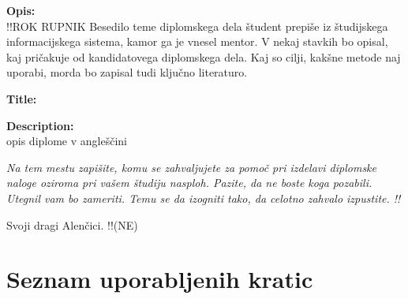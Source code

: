 \documentclass[a4paper,12pt,openright]{book}
\newcommand{\clearemptydoublepage}{\newpage{\pagestyle{empty}\cleardoublepage}}
\begin{document}
\bigskip
\noindent\textbf{Opis:}\\ !!ROK RUPNIK
Besedilo teme diplomskega dela študent prepiše iz študijskega informacijskega sistema, kamor ga je vnesel mentor. 
V nekaj stavkih bo opisal, kaj pričakuje od kandidatovega diplomskega dela. 
Kaj so cilji, kakšne metode naj uporabi, morda bo zapisal tudi ključno literaturo.

\bigskip
\noindent\textbf{Title:} 


\bigskip
\noindent\textbf{Description:}\\
opis diplome v angleščini

\vfill



\vspace{2cm}




\clearemptydoublepage

\thispagestyle{empty}\mbox{}\vfill\null\it%
\noindent 
Na tem mestu zapišite, komu se zahvaljujete za pomoč pri izdelavi diplomske naloge oziroma pri vašem študiju nasploh. Pazite, da ne boste koga pozabili. Utegnil vam bo zameriti. Temu se da izogniti tako, da celotno zahvalo izpustite.  !!
\rm\normalfont



\clearemptydoublepage

\thispagestyle{empty}\mbox{}{\textheight}\mbox{}\hfill\begin{minipage}{0.55\textwidth}%
Svoji dragi Alenčici. !!(NE)
\normalfont\end{minipage}

\clearemptydoublepage


\pagestyle{empty}
\def\thepage{}%
\tableofcontents{}


\clearemptydoublepage


\chapter*{Seznam uporabljenih kratic}
\end{document}
